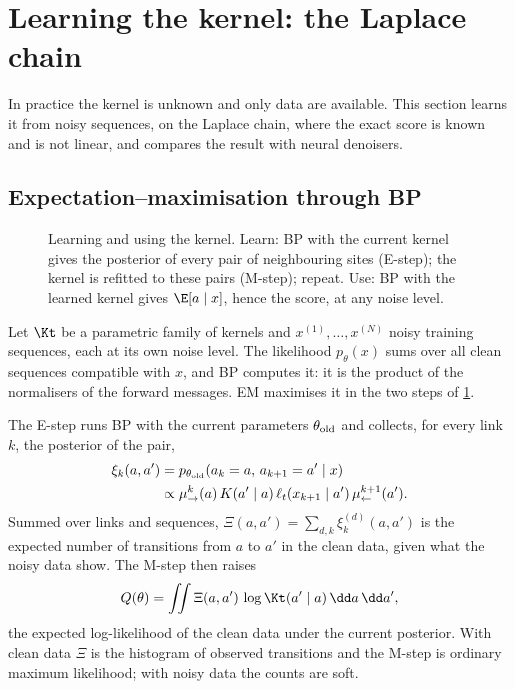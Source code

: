 \section{Learning the kernel: the Laplace chain}
\label{sec:laplace}

In practice the kernel is unknown and only data are available. This section learns it from noisy sequences, on the
Laplace chain, where the exact score is known and is not linear, and compares the result with neural denoisers.

\subsection{Expectation--maximisation through BP}
\label{sec:em}

\begin{figure}[t]
  \centering
  
  \caption{Learning and using the kernel. Learn: BP with the current kernel gives the posterior of every pair of
  neighbouring sites (E-step); the kernel is refitted to these pairs (M-step); repeat. Use: BP with the learned
  kernel gives $\E[a\mid x]$, hence the score, at any noise level.}
  \label{fig:em-loop}
\end{figure}

Let $\Kt$ be a parametric family of kernels and $x^{(1)},\dots,x^{(N)}$ noisy training sequences, each at its own
noise level. The likelihood $p_\theta(x)$ sums over all clean sequences compatible with $x$, and BP computes it: it is
the product of the normalisers of the forward messages. EM \cite{dempster1977maximum} maximises it in the two steps of
\cref{fig:em-loop}.

The E-step runs BP with the current parameters $\theta_{\rm old}$ and collects, for every link $k$, the posterior of
the pair,
\begin{align}
  \xi_k(a,a')&=p_{\theta_{\rm old}}(a_k=a,\,a_{k+1}=a'\mid x)\nonumber\\
  &\propto\mu_{\to}^{k}(a)\,K(a'\mid a)\,\ell_t(x_{k+1}\mid a')\,\mu_{\leftarrow}^{k+1}(a').
\end{align}
Summed over links and sequences, $\Xi(a,a')=\sum_{d,k}\xi_k^{(d)}(a,a')$ is the expected number of transitions from
$a$ to $a'$ in the clean data, given what the noisy data show. The M-step then raises
\begin{equation}
  Q(\theta)=\iint\Xi(a,a')\,\log\Kt(a'\mid a)\,\dd a\,\dd a',
  \label{eq:Q}
\end{equation}
the expected log-likelihood of the clean data under the current posterior. With clean data $\Xi$ is the histogram of
observed transitions and the M-step is ordinary maximum likelihood; with noisy data the counts are soft.

